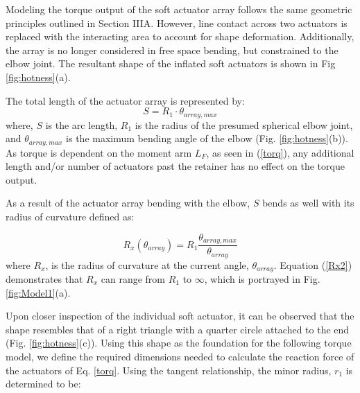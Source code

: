 \documentclass[letterpaper, 10 pt, conference]{ieeeconf}  %
\begin{document}
Modeling the torque output of the soft actuator array follows the same geometric principles outlined in Section IIIA. However, line contact across two actuators is replaced with the interacting area to account for shape deformation. Additionally, the array is no longer considered in free space bending, but constrained to the elbow joint. The resultant shape of the inflated soft actuators is shown in Fig \ref{fig:hotness}(a).  

The total length of the actuator array is represented by:
\begin{equation}\label{S}
	S = R_1\cdot\theta_{array,max}
\end{equation} 
where,  $S$ is the arc length, $R_1$ is the radius of the presumed spherical elbow joint, and  $\theta_{array,max}$ is the maximum bending angle of the elbow (Fig. \ref{fig:hotness}(b)). As torque is dependent on the moment arm $L_F$, as seen in (\ref{torq}), any additional length and/or number of actuators past the retainer has no effect on the torque output.

As a result of the actuator array bending with the elbow, $S$ bends as well with its radius of curvature defined as:

\begin{equation}\label{Rx2}
	R_x(\theta_{array}) = R_1\frac{\theta_{array,max}}{\theta_{array}}
\end{equation}
where $R_x$, is  the radius of curvature at the current angle, $\theta_{array}$.  Equation (\ref{Rx2}) demonstrates that $R_x$ can range from $R_1$ to ${\infty}$, which is portrayed in Fig. \ref{fig:Model1}(a).




Upon closer inspection of the individual soft actuator, it can be observed that the shape resembles that of a right triangle with a quarter circle attached to the end (Fig. \ref{fig:hotness}(c)).  Using this shape as the foundation for the following torque model, we define the required dimensions needed to calculate the reaction force of the actuators of Eq. \ref{torq}. Using the tangent relationship, the  minor radius, $r_1$ is determined to be: 
\end{document}
